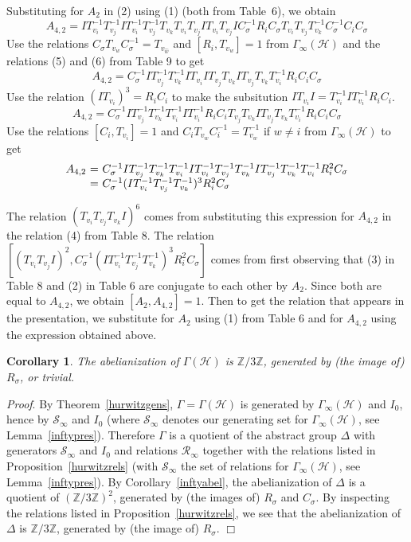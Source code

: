 \documentclass{article}[12pt]
\newcommand{\Z}{\mathbb{Z}}
\newtheorem{cor}{Corollary}
\newcommand{\Pf}{{\em Proof}. }
\newcommand{\EPf}{\hfill$\Box$\vspace{.5cm}}
\begin{document}
Substituting for $A_2$ in (2) using (1) (both from Table~6), we obtain
$$ A_{4,2} = I T_{v_i}^{-1} T_{v_j}^{-1} I T_{v_i}^{-1} T_{v_j}^{-1} T_{v_k} T_{v_i} T_{v_j} I T_{v_i} T_{v_j} I C_{\sigma}^{-1} R_i C_{\sigma} T_{v_i} T_{v_j} T_{v_k}^{-1} C_{\sigma}^{-1} C_i C_{\sigma} $$
Use the relations $C_{\sigma}T_{v_w}C_{\sigma}^{-1} = T_{v_{\hat{w}}}$ and $[R_i,T_{v_w}] = 1$ from $\Gamma_{\infty}(\mathcal{H})$ and the relations (5) and (6) from Table 9 to get
$$A_{4,2} = C_{\sigma}^{-1} I T_{v_j}^{-1} T_{v_k}^{-1} I T_{v_i} I T_{v_j} T_{v_k} I T_{v_j} T_{v_k} T_{v_i}^{-1} R_i C_i C_{\sigma} $$
Use the relation $(I T_{v_i})^3 = R_iC_i$ %
to make the subsitution $IT_{v_i} I = T_{v_i}^{-1} I T_{v_i}^{-1} R_i C_i$. 
$$A_{4,2} = C_{\sigma}^{-1} I T_{v_j}^{-1} T_{v_k}^{-1} T_{v_i}^{-1} I T_{v_i}^{-1} R_i C_i T_{v_j} T_{v_k} I T_{v_j} T_{v_k} T_{v_i}^{-1} R_i C_i C_{\sigma} $$
 Use the relations $[C_i,T_{v_i}] = 1$ and $C_i T_{v_w} C_i^{-1} = T_{v_w}^{-1}$ if $w\neq i$ from $\Gamma_{\infty}(\mathcal{H})$ to get
 $$
\begin{array}{r @{\,\,=\,\,}l}
  A_{4,2} & C_{\sigma}^{-1} I T_{v_j}^{-1} T_{v_k}^{-1} T_{v_i}^{-1} I T_{v_i}^{-1} T_{v_j}^{-1} T_{v_k}^{-1} I T_{v_j}^{-1} T_{v_k}^{-1} T_{v_i}^{-1} R_i^2 C_{\sigma} \\
  &  C_{\sigma}^{-1} (I T_{v_i}^{-1} T_{v_j}^{-1} T_{v_k}^{-1})^3 R_i^2 C_{\sigma}
  \end{array}
$$

The relation $(T_{v_i}T_{v_j}T_{v_k} I)^6$ comes from substituting this expression for $A_{4,2}$ in the relation (4) from Table 8.  The relation $[(T_{v_i}T_{v_j}I)^2,C_\sigma^{-1}(IT_{v_i}^{-1}T_{v_j}^{-1}T_{v_k}^{-1})^3R_i^2C_\sigma]$ comes from first observing that (3) in Table 8 and (2) in Table 6 are conjugate to each other by $A_2$.  Since both are equal to $A_{4,2}$, we obtain $[A_2,A_{4,2}] = 1$.  Then to get the relation that appears in the presentation, we substitute for $A_2$ using (1) from Table 6 and for $A_{4,2}$ using the expression obtained above.

\begin{cor} The abelianization of $\Gamma(\mathcal{H})$ is $\Z/3\Z$, generated by (the image of) $R_\sigma$, or trivial.
\end{cor}

\Pf By Theorem~\ref{hurwitzgens}, $\Gamma=\Gamma(\mathcal{H})$ is generated by $\Gamma_{\infty}(\mathcal{H})$ and $I_0$, hence by $\mathcal{S}_\infty$ and $I_0$ (where $\mathcal{S}_\infty$ denotes our generating set for $\Gamma_\infty(\mathcal{H})$, see Lemma~\ref{inftypres}). Therefore $\Gamma$ is a quotient of the abstract group $\Delta$ with generators $\mathcal{S}_\infty$ and $I_0$ and relations $\mathcal{R}_\infty$ together with the relations listed in Proposition~\ref{hurwitzrels} (with $\mathcal{S}_\infty$ the set of relations for $\Gamma_\infty(\mathcal{H})$, see Lemma~\ref{inftypres}). By Corollary~\ref{inftyabel}, the abelianization of $\Delta$ is a quotient of $(\Z/3\Z)^2$, generated by (the images of) $R_\sigma$ and $C_\sigma$. By inspecting the relations listed in Proposition~\ref{hurwitzrels}, we see that the abelianization of $\Delta$ is $\Z/3\Z$, generated by (the image of) $R_\sigma$.  \EPf
\end{document}
